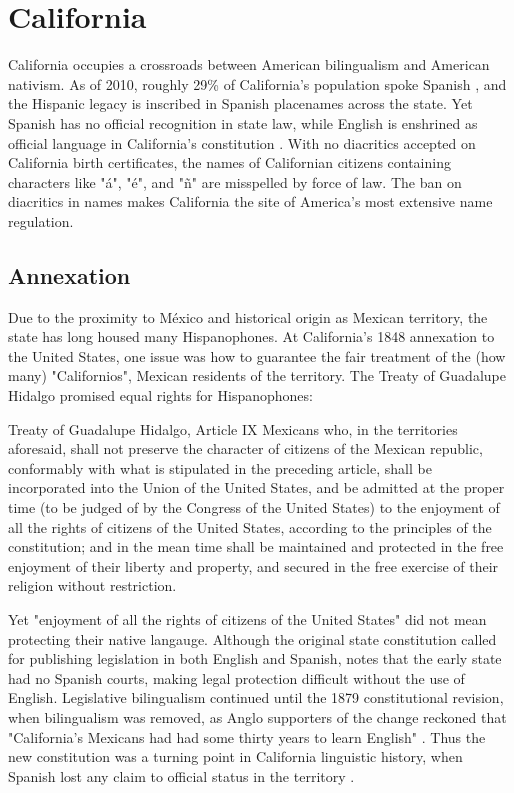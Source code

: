 \section{California}

California occupies a crossroads between American bilingualism and American
nativism. As of 2010, roughly 29\% of California's population spoke Spanish
\parencite{acs-lang-states}, and the Hispanic legacy is inscribed in Spanish
placenames across the state. Yet Spanish has no official recognition in state
law, while English is enshrined as official language in California's
constitution \parencite{ca-const}. With no diacritics accepted on California
birth certificates, the names of Californian citizens containing characters like
"á", "é", and "ñ" are misspelled by force of law. The ban on diacritics in names
makes California the site of America's most extensive name regulation.

\subsection{Annexation}

Due to the proximity to México and historical origin as Mexican territory, the
state has long housed many Hispanophones. At California's 1848 annexation to the
United States, one issue was how to guarantee the fair treatment of the (how many)
"Californios", Mexican residents of the territory. The Treaty of Guadalupe
Hidalgo promised equal rights for Hispanophones: 

\begin{aquote}{Treaty of Guadalupe Hidalgo, Article IX}
	Mexicans who, in the territories aforesaid, shall not preserve the character
	of citizens of the Mexican republic, conformably with what is stipulated in
	the preceding article, shall be incorporated into the Union of the United
	States, and be admitted at the proper time (to be judged of by the Congress of
	the United States) to the enjoyment of all the rights of citizens of the
	United States, according to the principles of the constitution; and in the
	mean time shall be maintained and protected in the free enjoyment of their
	liberty and property, and secured in the free exercise of their religion
	without restriction. \parencite{guadalupe}
\end{aquote}

Yet "enjoyment of all the rights of citizens of the United States" did not mean
protecting their native langauge. Although the original state constitution
called for publishing legislation in both English and Spanish,
\textcite{lamar-prieto14} notes that the early state had no Spanish courts,
making legal protection difficult without the use of English. Legislative
bilingualism continued until the 1879 constitutional revision, when bilingualism
was removed, as Anglo supporters of the change reckoned that "California's
Mexicans had had some thirty years to learn English" \parencite{baron92}. Thus
the new constitution was a turning point in California linguistic history, when
Spanish lost any claim to official status in the territory \parencite{baron02}. 


